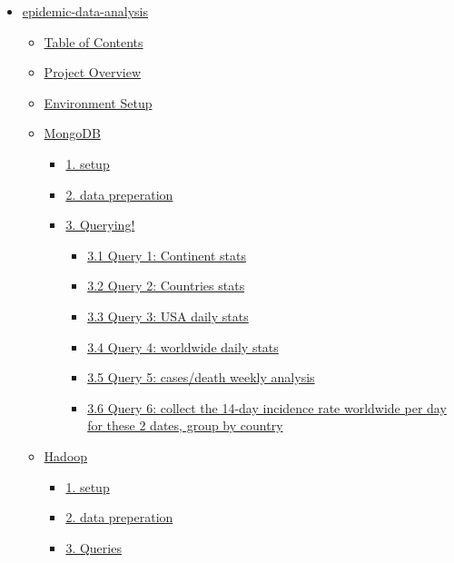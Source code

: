\documentclass[
]{article}
\providecommand{\tightlist}{%
  \setlength{\itemsep}{0pt}\setlength{\parskip}{0pt}}
\begin{document}
\begin{itemize}
\tightlist
\item
  \protect\hyperlink{epidemic-data-analysis}{epidemic-data-analysis}

  \begin{itemize}
  \tightlist
  \item
    \protect\hyperlink{table-of-contents}{Table of Contents}
  \item
    \protect\hyperlink{project-overview}{Project Overview}
  \item
    \protect\hyperlink{environment-setup}{Environment Setup}
  \item
    \protect\hyperlink{mongodb}{MongoDB}

    \begin{itemize}
    \tightlist
    \item
      \protect\hyperlink{1-setup}{1. setup}
    \item
      \protect\hyperlink{2-data-preperation}{2. data preperation}
    \item
      \protect\hyperlink{3-querying}{3. Querying!}

      \begin{itemize}
      \tightlist
      \item
        \protect\hyperlink{31-query-1-continent-stats}{3.1 Query 1:
        Continent stats}
      \item
        \protect\hyperlink{32-query-2-countries-stats}{3.2 Query 2:
        Countries stats}
      \item
        \protect\hyperlink{33-query-3-usa-daily-stats}{3.3 Query 3: USA
        daily stats}
      \item
        \protect\hyperlink{34-query-4-worldwide-daily-stats}{3.4 Query
        4: worldwide daily stats}
      \item
        \protect\hyperlink{35-query-5-casesdeath-weekly-analysis}{3.5
        Query 5: cases/death weekly analysis}
      \item
        \protect\hyperlink{36-query-6-collect-the-14-day-incidence-rate-worldwide-per-day-for-these-2-dates-group-by-country}{3.6
        Query 6: collect the 14-day incidence rate worldwide per day for
        these 2 dates, group by country}
      \end{itemize}
    \end{itemize}
  \item
    \protect\hyperlink{hadoop}{Hadoop}

    \begin{itemize}
    \tightlist
    \item
      \protect\hyperlink{1-setup-1}{1. setup}
    \item
      \protect\hyperlink{2-data-preperation-1}{2. data preperation}
    \item
      \protect\hyperlink{3-queries}{3. Queries}


\end{itemize}
\end{itemize}
\end{itemize}
\end{document}
